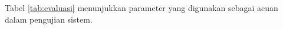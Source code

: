 \documentclass{elsinta}
\begin{document}
\subsection{\PerformanceCriteriaTitle}


Tabel \ref{tab:evaluasi} menunjukkan parameter yang digunakan sebagai acuan dalam pengujian sistem.
\end{document}
